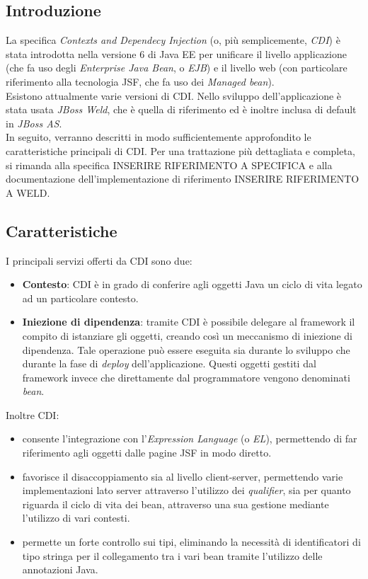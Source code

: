 \subsection{Introduzione}

La specifica \textsl{Contexts and Dependecy Injection} (o, più semplicemente, \textsl{CDI}) è stata introdotta nella versione 6 di Java EE per unificare il livello applicazione (che fa uso degli \textsl{Enterprise Java Bean}, o \textsl{EJB}) e il livello web (con particolare riferimento alla tecnologia JSF, che fa uso dei \textsl{Managed bean}).\\
Esistono attualmente varie versioni di CDI. Nello sviluppo dell'applicazione è stata usata \textsl{JBoss Weld}, che è quella di riferimento ed è inoltre inclusa di default in \textsl{JBoss AS}.\\
In seguito, verranno descritti in modo sufficientemente approfondito le caratteristiche principali di CDI. Per una trattazione più dettagliata e completa, si rimanda alla specifica INSERIRE RIFERIMENTO A SPECIFICA e alla documentazione dell'implementazione di riferimento INSERIRE RIFERIMENTO A WELD.

\subsection{Caratteristiche}

I principali servizi offerti da CDI sono due:

\begin{itemize}
\item \textbf{Contesto}: CDI è in grado di conferire agli oggetti Java un ciclo di vita legato ad un particolare contesto.
\item \textbf{Iniezione di dipendenza}: tramite CDI è possibile delegare al framework il compito di istanziare gli oggetti, creando così un meccanismo di iniezione di dipendenza. Tale operazione può essere eseguita sia durante lo sviluppo che durante la fase di \textit{deploy} dell'applicazione. Questi oggetti gestiti dal framework invece che direttamente dal programmatore vengono denominati \textsl{bean}.
\end{itemize}

Inoltre CDI:

\begin{itemize}
\item consente l'integrazione con l'\textsl{Expression Language} (o \textsl{EL}), permettendo di far riferimento agli oggetti dalle pagine JSF in modo diretto.
\item favorisce il disaccoppiamento sia al livello client-server, permettendo varie implementazioni lato server attraverso l'utilizzo dei \textit{qualifier}, sia per quanto riguarda il ciclo di vita dei bean, attraverso una sua gestione mediante l'utilizzo di vari contesti.
\item permette un forte controllo sui tipi, eliminando la necessità di identificatori di tipo stringa per il collegamento tra i vari bean tramite l'utilizzo delle annotazioni Java.
\end{itemize}

